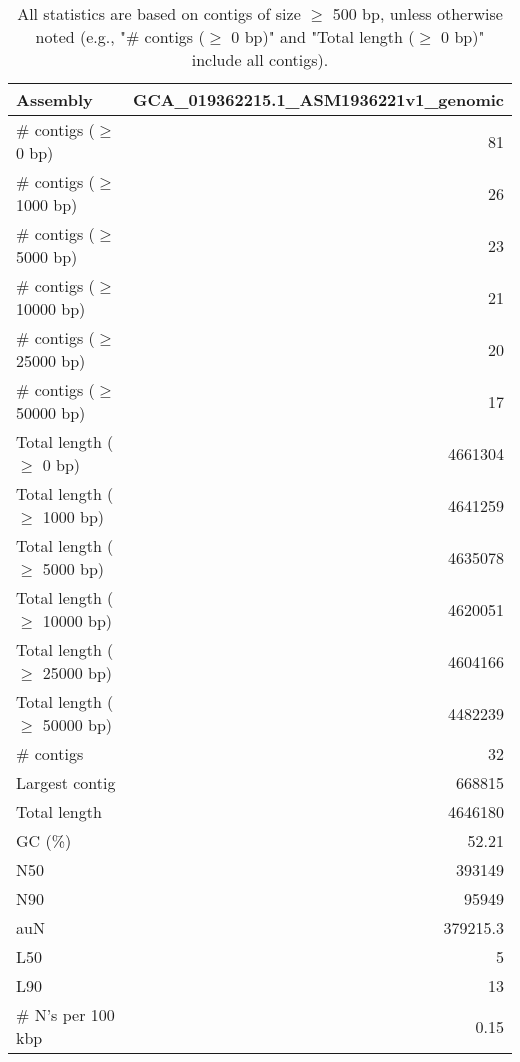 \documentclass[12pt,a4paper]{article}
\begin{document}
\begin{table}[ht]
\begin{center}
\caption{All statistics are based on contigs of size $\geq$ 500 bp, unless otherwise noted (e.g., "\# contigs ($\geq$ 0 bp)" and "Total length ($\geq$ 0 bp)" include all contigs).}
\begin{tabular}{|l*{1}{|r}|}
\hline
Assembly & GCA\_019362215.1\_ASM1936221v1\_genomic \\ \hline
\# contigs ($\geq$ 0 bp) & 81 \\ \hline
\# contigs ($\geq$ 1000 bp) & 26 \\ \hline
\# contigs ($\geq$ 5000 bp) & 23 \\ \hline
\# contigs ($\geq$ 10000 bp) & 21 \\ \hline
\# contigs ($\geq$ 25000 bp) & 20 \\ \hline
\# contigs ($\geq$ 50000 bp) & 17 \\ \hline
Total length ($\geq$ 0 bp) & 4661304 \\ \hline
Total length ($\geq$ 1000 bp) & 4641259 \\ \hline
Total length ($\geq$ 5000 bp) & 4635078 \\ \hline
Total length ($\geq$ 10000 bp) & 4620051 \\ \hline
Total length ($\geq$ 25000 bp) & 4604166 \\ \hline
Total length ($\geq$ 50000 bp) & 4482239 \\ \hline
\# contigs & 32 \\ \hline
Largest contig & 668815 \\ \hline
Total length & 4646180 \\ \hline
GC (\%) & 52.21 \\ \hline
N50 & 393149 \\ \hline
N90 & 95949 \\ \hline
auN & 379215.3 \\ \hline
L50 & 5 \\ \hline
L90 & 13 \\ \hline
\# N's per 100 kbp & 0.15 \\ \hline
\end{tabular}
\end{center}
\end{table}
\end{document}
